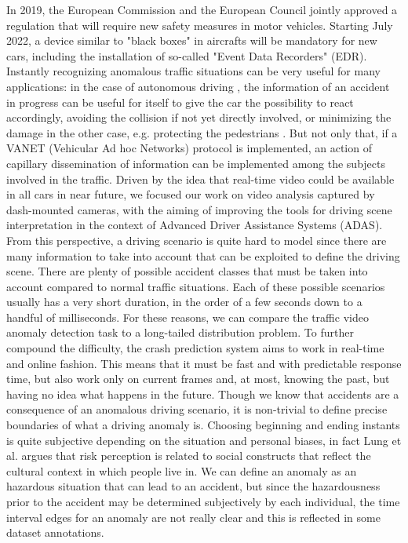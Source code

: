 In 2019, the European Commission and the European Council jointly approved a regulation that will require new safety measures in motor vehicles.
Starting July 2022, a device similar to "black boxes" in aircrafts will be mandatory for new cars, including the installation of so-called "Event Data Recorders" (EDR).
Instantly recognizing anomalous traffic situations can be very useful for many applications:
in the case of autonomous driving \cite{codevilla2019exploring}, the information of an accident in progress can be useful for itself to give the car the possibility to react accordingly, avoiding the collision if not yet directly involved, or minimizing the damage in the other case, e.g. protecting the pedestrians \cite{4298901}.
But not only that, if a VANET (Vehicular Ad hoc Networks) protocol \cite{fatemidokht2021efficient} is implemented, an action of capillary dissemination of information can be implemented among the subjects involved in the traffic.
Driven by the idea that real-time video could be available in all cars in near future, we focused our work on video analysis captured by dash-mounted cameras, with the aiming of improving the tools for driving scene interpretation in the context of Advanced Driver Assistance Systems (ADAS).
From this perspective, a driving scenario is quite hard to model since there are many information to take into account that can be exploited to define the driving scene.
There are plenty of possible accident classes that must be taken into account compared to normal traffic situations.
Each of these possible scenarios usually has a very short duration, in the order of a few seconds down to a handful of milliseconds.
For these reasons, we can compare the traffic video anomaly detection task to a long-tailed distribution problem.
To further compound the difficulty, the crash prediction system aims to work in real-time and online fashion.
This means that it must be fast and with predictable response time, but also work only on current frames and, at most, knowing the past, but having no idea what happens in the future.
Though we know that accidents are a consequence of an anomalous driving scenario, it is non-trivial to define precise boundaries of what a driving anomaly is.
Choosing beginning and ending instants is quite subjective depending on the situation and personal biases, in fact Lung et al. \cite{lund2009riskperception} argues that risk perception is related to social constructs that reflect the cultural context in which people live in.
We can define an anomaly as an hazardous situation that can lead to an accident, but since the hazardousness prior to the accident may be determined subjectively by each individual, the time interval edges for an anomaly are not really clear and this is reflected in some dataset annotations.
